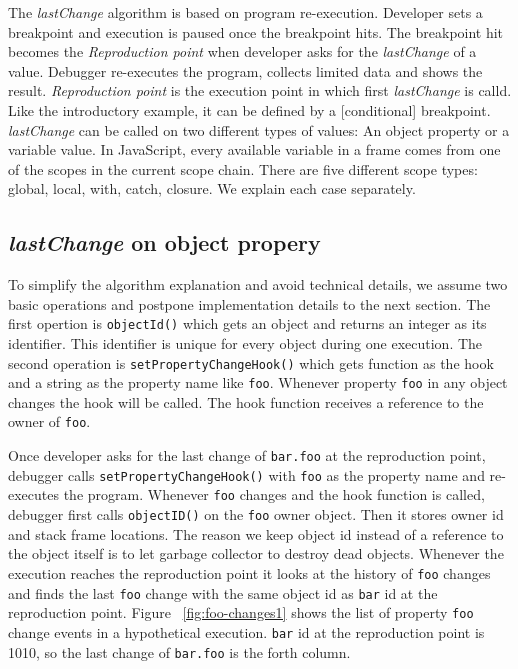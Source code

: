 \documentclass[preprint]{sigplanconf}
\begin{document}
The \textit{lastChange} algorithm is based on program re-execution. Developer sets a breakpoint and execution is paused once the breakpoint hits. The breakpoint hit becomes the \textit{Reproduction point} when developer asks for the \textit{lastChange} of a value. Debugger re-executes the program, collects limited data and shows the result. \textit{Reproduction point} is the execution point in which first \textit{lastChange} is calld. Like the introductory example, it can be defined by a [conditional] breakpoint. \textit{lastChange} can be called on two different types of values: An object property or a variable value. In JavaScript, every available variable in a frame comes from one of the scopes in the current scope chain. There are five different scope types: global, local, with, catch, closure. We explain each case separately.

\subsection{\textit{lastChange} on object propery}
To simplify the algorithm explanation and avoid technical details, we assume two basic operations and postpone implementation details to the next section. The first opertion is \texttt{objectId()} which gets an object and returns an integer as its identifier. This identifier is unique for every object during one execution. The second operation is \texttt{setPropertyChangeHook()} which gets function as the hook and a string as the property name like \texttt{foo}. Whenever property \texttt{foo} in any object changes the hook will be called. The hook function receives a reference to the owner of \texttt{foo}.

Once developer asks for the last change of \texttt{bar.foo} at the reproduction point, debugger calls \texttt{setPropertyChangeHook()} with \texttt{foo} as the property name and re-executes the program. Whenever \texttt{foo} changes and the hook function is called, debugger first calls \texttt{objectID()} on the \texttt{foo} owner object. Then it stores owner id and stack frame locations. The reason we keep object id instead of a reference to the object itself is to let garbage collector to destroy dead objects. Whenever the execution reaches the reproduction point it looks at the history of \texttt{foo} changes and finds the last \texttt{foo} change with the same object id as \texttt{bar} id at the reproduction point. Figure ~\ref{fig:foo-changes1} shows the list of property \texttt{foo} change events in a hypothetical execution. \texttt{bar} id at the reproduction point is 1010, so the last change of \texttt{bar.foo} is the forth column.
\end{document}
